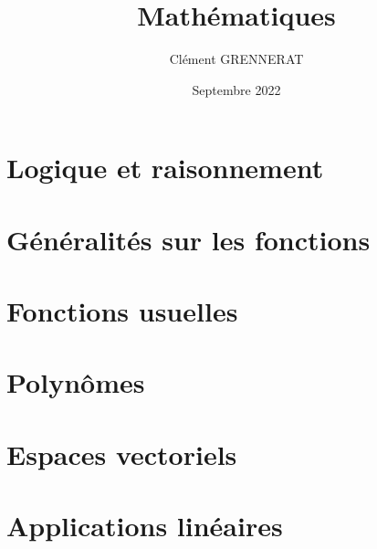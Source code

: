 \documentclass[13pt, twoside, a4paper, french]{report}
\newcommand*{\getSubject}{Mathématiques}
\begin{document}
\title{\getSubject}
\author{Clément GRENNERAT}
\date{Septembre 2022}
\pagestyle{non-chapter-style}

\chapter{Logique et raisonnement}\label{ch:logique-et-raisonnement}
  
  

\chapter{Généralités sur les fonctions}\label{ch:generalites-sur-les-fonctions}
  


\chapter{Fonctions usuelles}\label{ch:fonctions-usuelles}
  


\chapter{Polynômes}\label{ch:polynomes}
  
  
\chapter{Espaces vectoriels}\label{ch:espaces-vectoriels}
  

\chapter{Applications linéaires}\label{ch:applications-lineaires}
  
  
\end{document}
